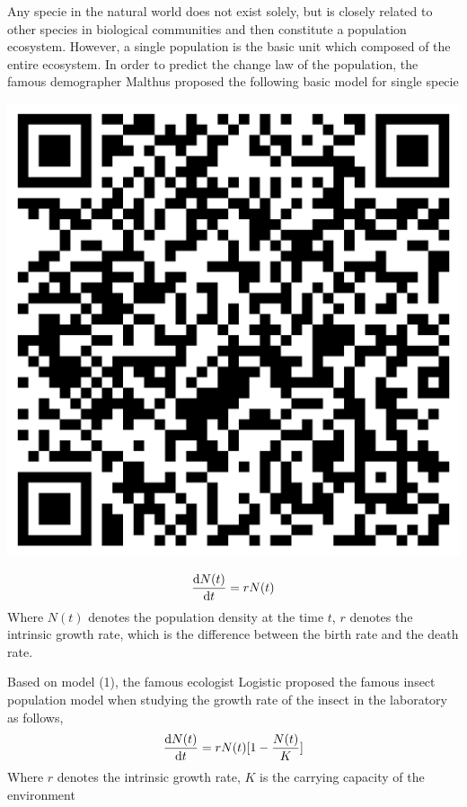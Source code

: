 \begin{minipage}{0.75\textwidth}
    Any specie in the natural world does not exist solely,
    but is closely related to other species in biological
    communities and then constitute a population ecosystem.
    However,        a single population is the basic unit which
    composed of the entire ecosystem. In order to predict
    the change law of the population, the famous demographer
    Malthus proposed the following basic model for single
    specie
\end{minipage}
\begin{minipage}{0.25\textwidth}
    \hspace*{1cm}\includegraphics[scale=.08]{Biomath_link.png}
\end{minipage}
\begin{equation}
    \dv{N(t)}{t} =rN(t)
\end{equation}
Where $N(t)$ denotes the population density at the time $t$, $r$ denotes the intrinsic growth rate, which is the difference between the birth rate and the death rate.

Based on model (1), the famous ecologist Logistic proposed the famous insect population model when studying the growth rate of the insect in the laboratory as follows,
\[
    \dv{N(t)}{t} =rN(t)[1-\frac{N(t)}{K}]
\]
Where $r$ denotes the intrinsic growth rate, $K$ is the carrying capacity of the environment


